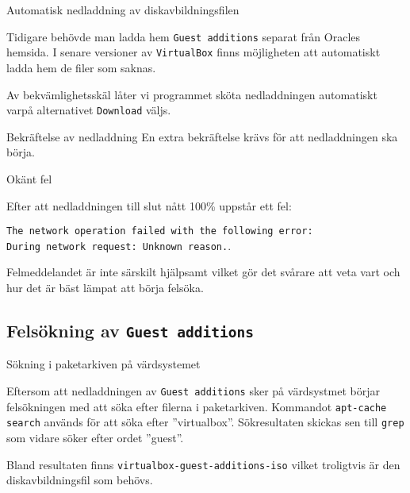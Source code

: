            {Automatisk nedladdning av diskavbildningsfilen}
           {Tidigare behövde man ladda hem \texttt{Guest additions} separat från
            Oracles hemsida. I senare versioner av \texttt{VirtualBox} finns
            möjligheten att automatiskt ladda hem de filer som saknas.
            \par Av bekvämlighetsskäl låter vi programmet sköta nedladdningen
            automatiskt varpå alternativet \texttt{Download} väljs.}
           {}

           {Bekräftelse av nedladdning}
           {En extra bekräftelse krävs för att nedladdningen ska börja.}
           {}

           {Okänt fel}
           {Efter att nedladdningen till slut nått 100\% uppstår ett fel:
            \par \texttt{The network operation failed with the following error:
            \\ During network request: Unknown reason.}.
            \par Felmeddelandet är inte särskilt hjälpsamt vilket gör det
            svårare att veta vart och hur det är bäst lämpat att börja felsöka.}
           {}


\subsection{Felsökning av \texttt{Guest additions}}

           {Sökning i paketarkiven på värdsystemet}
           {Eftersom att nedladdningen av \texttt{Guest additions} sker på
            värdsystmet börjar felsökningen med att söka efter filerna i
            paketarkiven. Kommandot \texttt{apt-cache search} används för att
            söka efter ''virtualbox''. Sökresultaten skickas sen till
            \texttt{grep} som vidare söker efter ordet ''guest''.
            \par Bland resultaten finns \texttt{virtualbox-guest-additions-iso}
            vilket troligtvis är den diskavbildningsfil som behövs.}
           {}

